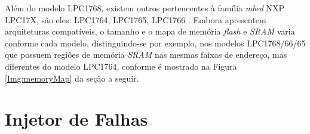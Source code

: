 Além do modelo LPC1768, existem outros pertencentes à família \textit{mbed} NXP LPC17X, são eles: LPC1764, LPC1765, LPC1766 \cite{manualLpc176x:2016}. Embora apresentem arquiteturas compatíveis, o tamanho e o mapa de memória \textit{flash} e \textit{SRAM} varia conforme cada modelo, distinguindo-se por exemplo, nos modelos LPC1768/66/65 que possuem regiões de memória \textit{SRAM} nas mesmas faixas de endereço, mas diferentes do modelo LPC1764, conforme é mostrado na Figura \ref{Img:memoryMap} da seção a seguir.





\section{Injetor de Falhas} \label{sec:InjetorDeFalhas}

